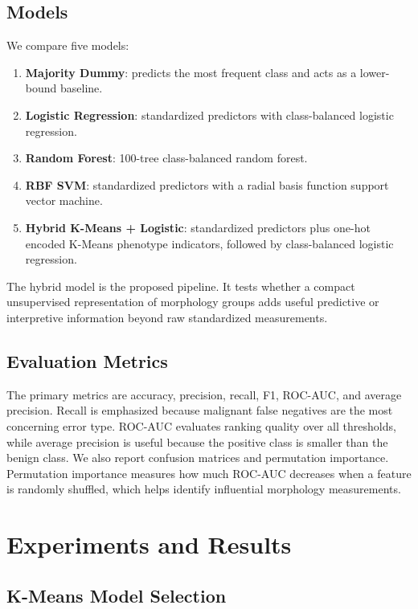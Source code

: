 \documentclass{article}
\begin{document}
\subsection{Models}

We compare five models:
\begin{enumerate}
    \item \textbf{Majority Dummy}: predicts the most frequent class and acts as a lower-bound baseline.
    \item \textbf{Logistic Regression}: standardized predictors with class-balanced logistic regression.
    \item \textbf{Random Forest}: 100-tree class-balanced random forest.
    \item \textbf{RBF SVM}: standardized predictors with a radial basis function support vector machine.
    \item \textbf{Hybrid K-Means + Logistic}: standardized predictors plus one-hot encoded K-Means phenotype indicators, followed
    by class-balanced logistic regression.
\end{enumerate}
The hybrid model is the proposed pipeline. It tests whether a compact unsupervised representation of morphology groups adds
useful predictive or interpretive information beyond raw standardized measurements.

\subsection{Evaluation Metrics}

The primary metrics are accuracy, precision, recall, F1, ROC-AUC, and average precision. Recall is emphasized because
malignant false negatives are the most concerning error type. ROC-AUC evaluates ranking quality over all thresholds, while
average precision is useful because the positive class is smaller than the benign class. We also report confusion matrices
and permutation importance. Permutation importance measures how much ROC-AUC decreases when a feature is randomly
shuffled, which helps identify influential morphology measurements.

\section{Experiments and Results}

\subsection{K-Means Model Selection}
\end{document}
